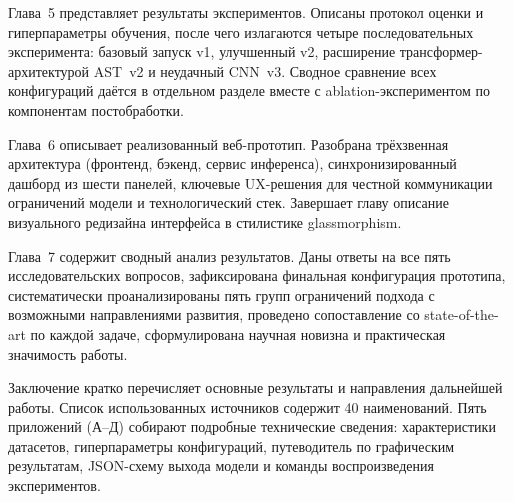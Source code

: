 Глава~5 представляет результаты экспериментов. Описаны протокол оценки и гиперпараметры обучения, после чего излагаются четыре последовательных эксперимента: базовый запуск v1, улучшенный v2, расширение трансформер-архитектурой AST~v2 и неудачный CNN~v3. Сводное сравнение всех конфигураций даётся в отдельном разделе вместе с ablation-экспериментом по компонентам постобработки.

Глава~6 описывает реализованный веб-прототип. Разобрана трёхзвенная архитектура (фронтенд, бэкенд, сервис инференса), синхронизированный дашборд из шести панелей, ключевые UX-решения для честной коммуникации ограничений модели и технологический стек. Завершает главу описание визуального редизайна интерфейса в стилистике glassmorphism.

Глава~7 содержит сводный анализ результатов. Даны ответы на все пять исследовательских вопросов, зафиксирована финальная конфигурация прототипа, систематически проанализированы пять групп ограничений подхода с возможными направлениями развития, проведено сопоставление со state-of-the-art по каждой задаче, сформулирована научная новизна и практическая значимость работы.

Заключение кратко перечисляет основные результаты и направления дальнейшей работы. Список использованных источников содержит 40 наименований. Пять приложений (А--Д) собирают подробные технические сведения: характеристики датасетов, гиперпараметры конфигураций, путеводитель по графическим результатам, JSON-схему выхода модели и команды воспроизведения экспериментов.

